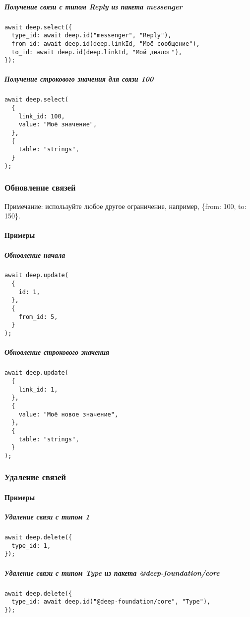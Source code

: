 \documentclass{article}
\begin{document}
\subparagraph{Получение связи с типом Reply из пакета messenger}
\begin{verbatim}
await deep.select({
  type_id: await deep.id("messenger", "Reply"),
  from_id: await deep.id(deep.linkId, "Моё сообщение"),
  to_id: await deep.id(deep.linkId, "Мой диалог"),
});
\end{verbatim}

\subparagraph{Получение строкового значения для связи 100}
\begin{verbatim}
await deep.select(
  {
    link_id: 100,
    value: "Моё значение",
  },
  {
    table: "strings",
  }
);
\end{verbatim}

\subsubsection{Обновление связей}

Примечание: используйте любое другое ограничение, например, \{from: 100, to: 150\}.

\paragraph{Примеры}

\subparagraph{Обновление начала}
\begin{verbatim}
await deep.update(
  {
    id: 1,
  },
  {
    from_id: 5,
  }
);
\end{verbatim}

\subparagraph{Обновление строкового значения}
\begin{verbatim}
await deep.update(
  {
    link_id: 1,
  },
  {
    value: "Моё новое значение",
  },
  {
    table: "strings",
  }
);
\end{verbatim}

\subsubsection{Удаление связей}

\paragraph{Примеры}

\subparagraph{Удаление связи с типом 1}
\begin{verbatim}
await deep.delete({
  type_id: 1,
});
\end{verbatim}

\subparagraph{Удаление связи с типом Type из пакета @deep-foundation/core}
\begin{verbatim}
await deep.delete({
  type_id: await deep.id("@deep-foundation/core", "Type"),
});
\end{verbatim}
\end{document}
